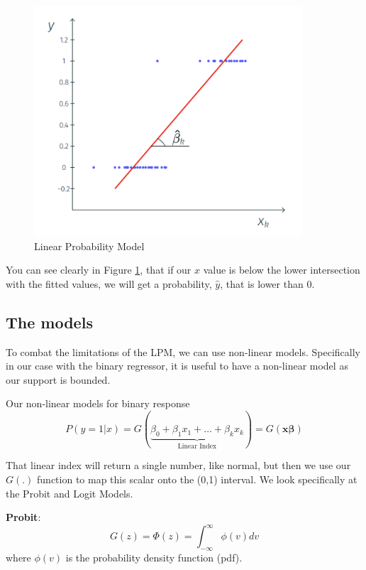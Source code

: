 \documentclass[11pt]{article}
\begin{document}
\begin{figure}[h]
    \centering
    \includegraphics[width=10cm]{photos/LPM.png}
    \caption{Linear Probability Model}
    \label{fig:LPM}
\end{figure}

You can see clearly in Figure \ref{fig:LPM}, that if our $x$ value is below the lower intersection with the fitted values, we will get a probability, $\hat{y}$, that is lower than 0.


\subsection{The models}

To combat the limitations of the LPM, we can use non-linear models. Specifically in our case with the binary regressor, it is useful to have a non-linear model as our support is bounded.

Our non-linear models for binary response
\[P(y=1|x) = G(\underbrace{\beta_0 + \beta_1 x_1+ \ldots + \beta_k x_k}_{\text{Linear Index}}) = G(\boldsymbol{x\beta})\]

That linear index will return a single number, like normal, but then we use our $G(.)$ function to map this scalar onto the (0,1) interval. We look specifically at the Probit and Logit Models.

\begin{definition}
    \textbf{Probit}:
    \begin{equation}
        \label{Probit}
        G(z) = \Phi (z) = \int_{-\infty}^\infty \phi (v) dv
    \end{equation}
    where $\phi(v)$ is the probability density function (pdf).
\end{definition}
\end{document}
